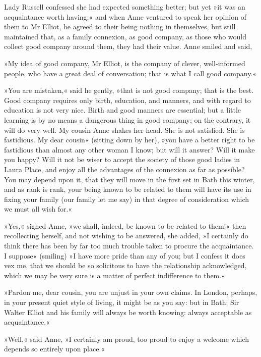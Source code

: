 Lady Russell confessed she had expected something better; but yet »it was an acquaintance worth having;« and when Anne ventured to speak her opinion of them to Mr Elliot, he agreed to their being nothing in themselves, but still maintained that, as a family connexion, as good company, as those who would collect good company around them, they had their value. Anne smiled and said,

»My idea of good company, Mr Elliot, is the company of clever, well-informed people, who have a great deal of conversation; that is what I call good company.«

»You are mistaken,« said he gently, »that is not good company; that is the best. Good company requires only birth, education, and manners, and with regard to education is not very nice. Birth and good manners are essential; but a little learning is by no means a dangerous thing in good company; on the contrary, it will do very well. My cousin Anne shakes her head. She is not satisfied. She is fastidious. My dear cousin« (sitting down by her), »you have a better right to be fastidious than almost any other woman I know; but will it answer? Will it make you happy? Will it not be wiser to accept the society of those good ladies in Laura Place, and enjoy all the advantages of the connexion as far as possible? You may depend upon it, that they will move in the first set in Bath this winter, and as rank is rank, your being known to be related to them will have its use in fixing your family (our family let me say) in that degree of consideration which we must all wish for.«

»Yes,« sighed Anne, »we shall, indeed, be known to be related to them!« then recollecting herself, and not wishing to be answered, she added, »I certainly do think there has been by far too much trouble taken to procure the acquaintance. I suppose« (smiling) »I have more pride than any of you; but I confess it does vex me, that we should be so solicitous to have the relationship acknowledged, which we may be very sure is a matter of perfect indifference to them.«

»Pardon me, dear cousin, you are unjust in your own claims. In London, perhaps, in your present quiet style of living, it might be as you say: but in Bath; Sir Walter Elliot and his family will always be worth knowing: always acceptable as acquaintance.«

»Well,« said Anne, »I certainly am proud, too proud to enjoy a welcome which depends so entirely upon place.«

